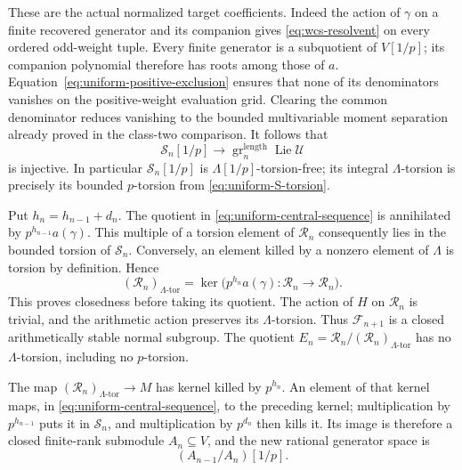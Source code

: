 These are the actual normalized target coefficients.
Indeed the action of \(\gamma\) on a finite recovered
generator and its companion gives
\eqref{eq:wcs-resolvent} on every ordered odd-weight tuple.
Every finite generator is a subquotient of \(V[1/p]\);
its companion polynomial therefore has roots among those
of \(a\).  Equation~\eqref{eq:uniform-positive-exclusion}
ensures that none of its denominators vanishes on the
positive-weight evaluation grid.  Clearing the common
denominator reduces vanishing to the bounded multivariable
moment separation already proved in the class-two
comparison.  It follows that
\begin{equation}\label{eq:uniform-S-injection}
 \mathcal S_n[1/p]\longrightarrow
   \operatorname{gr}^{\mathrm{length}}_n
                          \operatorname{Lie}\mathcal U
\end{equation}
is injective.  In particular \(\mathcal S_n[1/p]\) is
\(\Lambda[1/p]\)-torsion-free; its integral
\(\Lambda\)-torsion is precisely its bounded
\(p\)-torsion from \eqref{eq:uniform-S-torsion}.

Put \(h_n=h_{n-1}+d_n\).  The quotient in
\eqref{eq:uniform-central-sequence} is annihilated by
\(p^{h_{n-1}}a(\gamma)\).  This multiple of a torsion
element of \(\mathcal R_n\) consequently lies in the bounded
torsion of \(\mathcal S_n\).  Conversely, an element killed
by a nonzero element of \(\Lambda\) is torsion by
definition.  Hence
\begin{equation}\label{eq:uniform-closed-torsion}
 (\mathcal R_n)_{\Lambda\text{-tor}}
           =\ker\bigl(p^{h_n}a(\gamma):\mathcal R_n\to \mathcal R_n\bigr).
\end{equation}
This proves closedness before taking its quotient.
The action of \(H\) on \(\mathcal R_n\) is trivial, and the
arithmetic action preserves its \(\Lambda\)-torsion.
Thus \(\mathcal F_{n+1}\) is a closed arithmetically stable
normal subgroup.  The quotient
\(E_n=\mathcal R_n/(\mathcal R_n)_{\Lambda\text{-tor}}\) has no
\(\Lambda\)-torsion, including no \(p\)-torsion.

The map \((\mathcal R_n)_{\Lambda\text{-tor}}\to M\) has kernel
killed by \(p^{h_n}\).  An element of that kernel maps,
in \eqref{eq:uniform-central-sequence}, to the preceding
kernel; multiplication by \(p^{h_{n-1}}\) puts it in
\(\mathcal S_n\), and multiplication by \(p^{d_n}\) then kills it.
Its image is therefore a closed finite-rank submodule
\(A_n\subseteq V\), and the new rational generator space is
\[
                         (A_{n-1}/A_n)[1/p].
\]


